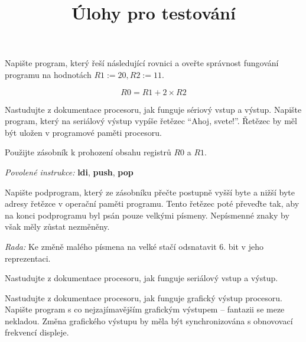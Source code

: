 \documentclass[a4,12pt]{exam}
\title{Úlohy pro testování}
\author{}
\date{}
\begin{document}
\maketitle

\begin{questions}
	
	
	Napište program, který řeší následující rovnici a oveřte správnost fungování programu na hodnotách \( R1 := 20, R2 := 11 \).
	
	\[ R0 = R1 + 2 \times R2 \]
	
	
	Nastudujte z dokumentace procesoru, jak funguje sériový vstup a výstup. Napište program, který na seriálový výstup vypíše řetězec ``Ahoj, svete!''. Řetězec by měl být uložen v programové paměti procesoru.
	
	
	Použijte zásobník k prohození obsahu registrů \(R0\) a \(R1\).
	
	\textit{Povolené instrukce:} \textbf{ldi}, \textbf{push}, \textbf{pop}
	
	
	Napište podprogram, který ze zásobníku přečte postupně vyšší byte a nižší byte adresy řetězce v operační paměti programu. Tento řetězec poté převeďte tak, aby na konci podprogramu byl psán pouze velkými písmeny. Nepísmenné znaky by však měly zůstat nezměněny.
	
	\textit{Rada:} Ke změně malého písmena na velké stačí odsnatavit 6. bit v jeho reprezentaci.
	
	
	Nastudujte z dokumentace procesoru, jak funguje seriálový vstup a výstup.
	

	
	Nastudujte z dokumentace procesoru, jak funguje grafický výstup procesoru. Napište program s co nejzajímavějším grafickým výstupem -- fantazii se meze nekladou. Změna grafického výstupu by měla být synchronizována s obnovovací frekvencí displeje.
	
\end{questions}
\end{document}
